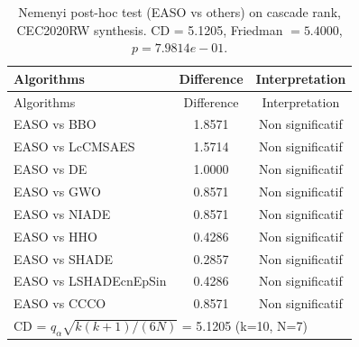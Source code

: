\begin{center}
\small
\renewcommand{\arraystretch}{1.25}
\begin{longtable}{lcc}
\caption{Nemenyi post-hoc test (EASO vs others) on cascade rank, CEC2020RW  synthesis. CD = 5.1205, Friedman $=5.4000$, $p=7.9814e-01$.}
\label{tab:nemenyi_cascade_CEC2020RW_synthesis} \\
\toprule
Algorithms & Difference & Interpretation \\
\midrule
\endfirsthead
\toprule
Algorithms & Difference & Interpretation \\
\midrule
\endhead
EASO vs BBO & 1.8571 & Non significatif \\
EASO vs LcCMSAES & 1.5714 & Non significatif \\
EASO vs DE & 1.0000 & Non significatif \\
EASO vs GWO & 0.8571 & Non significatif \\
EASO vs NIADE & 0.8571 & Non significatif \\
EASO vs HHO & 0.4286 & Non significatif \\
EASO vs SHADE & 0.2857 & Non significatif \\
EASO vs LSHADEcnEpSin & 0.4286 & Non significatif \\
EASO vs CCCO & 0.8571 & Non significatif \\
\midrule
\multicolumn{3}{l}{CD = $q_\alpha \sqrt{k(k+1)/(6N)}$ = 5.1205 (k=10, N=7)} \\
\bottomrule
\end{longtable}
\end{center}